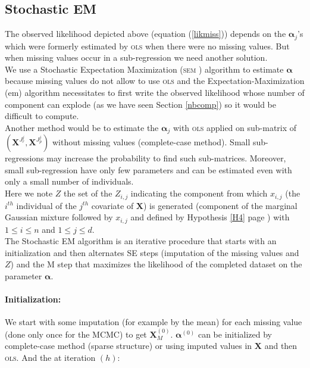 \documentclass[12pt,a4paper]{report}
\begin{document}
\subsection{Stochastic EM}\label{sectionSEMalgo}
	The observed likelihood depicted above (equation (\ref{likmiss})) depends on the $\boldsymbol{\alpha}_j$'s which were formerly estimated by \textsc{ols} when there were no missing values. But when missing values occur in a sub-regression we need another solution.\\
	
	We use a  Stochastic Expectation Maximization (\textsc{sem} \cite{celeux1986algorithme}) algorithm  to estimate $\boldsymbol{\alpha}$ because missing values do not allow to use \textsc{ols} and  the Expectation-Maximization ({\sc em}) algorithm necessitates to first write the observed likelihood whose number of component can explode (as we have seen Section \ref{nbcomp}) so it would be difficult to compute.\\
	
	Another method would be to estimate the $\boldsymbol{\alpha}_j$ with \textsc{ols} applied on sub-matrix of $(\boldsymbol{X}^{J_r^j},\boldsymbol{X}^{J_p^j})$ without missing values (complete-case method). Small sub-regressions may increase the probability to find such sub-matrices. Moreover, small sub-regression have only few parameters and can be estimated even with only a small number of individuals.\\
	
		Here we note $Z$ the set of the $Z_{i,j}$ indicating the component from which $x_{i,j}$ (the $i^{th}$ individual of the $j^{th}$ covariate of $\boldsymbol{X}$) is generated (component of the marginal Gaussian mixture followed by $x_{i,j}$ and defined by Hypothesis \ref{H4} page \pageref{H4}) with $1\leq i\leq n$ and $1\leq j\leq d$. \\
		
	The Stochastic EM algorithm is an iterative procedure that starts with an initialization and then alternates SE steps (imputation of the missing values and $Z$) and the M step that maximizes the likelihood of the completed dataset on the parameter $\boldsymbol{\alpha}$.
	
	\paragraph{Initialization:} We start with some imputation (for example by the mean) for each missing value (done only once for the MCMC) to get $\boldsymbol{X}_M^{(0)}$. $\boldsymbol{\alpha}^{(0)}$ can be initialized by complete-case method	(sparse structure) or using imputed values in $\boldsymbol{X}$ and then \textsc{ols}.
	And the at iteration $(h)$:
\end{document}

